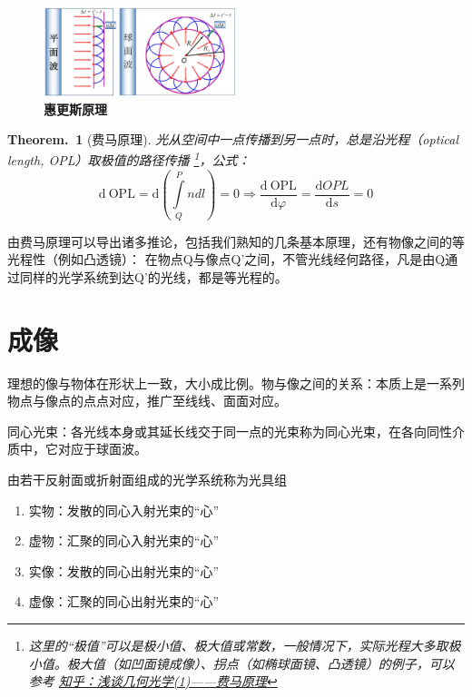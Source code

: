 \documentclass[UTF8]{report}
\theoremstyle{MyLineTheoremStyle} %
\theoremstyle{MyBlockTheoremStyle} %
\newtheorem{BlockTheorem}[LineTheorem]{Theorem.\,} %
\theoremstyle{MySubsubsectionStyle} %
\begin{document}
\begin{figure}[H]\centering
\includegraphics[width=0.5\textwidth]{assets/1,2/image (46).jpg}
\caption{\textbf{惠更斯原理}}\label{惠更斯原理}
\end{figure}

\begin{BlockTheorem}[费马原理]\label{费马原理}
光从空间中一点传播到另一点时，总是沿光程（optical length, OPL）取极值的路径传播 \footnote{这里的“极值”可以是极小值、极大值或常数，一般情况下，实际光程大多取极小值。极大值（如凹面镜成像）、拐点（如椭球面镜、凸透镜）的例子，可以参考 \href{https://zhuanlan.zhihu.com/p/107739173}{知乎：浅谈几何光学(1)——费马原理}}，公式：
\begin{equation}
    \mathrm{d}\ \mathrm{OPL} =  \mathrm{d}\left(\int\limits_{Q}^{P}ndl\right)=0 \Longrightarrow \frac{\mathrm{d}\  \mathrm{OPL} }{\mathrm{d} \varphi } = \frac{\mathrm{d} OPL }{\mathrm{d} s } = 0 
\end{equation}
\end{BlockTheorem}
由费马原理可以导出诸多推论，包括我们熟知的几条基本原理，还有物像之间的等光程性（例如凸透镜）：
在物点Q与像点Q’之间，不管光线经何路径，凡是由Q通过同样的光学系统到达Q’的光线，都是等光程的。

\section{成像}

理想的像与物体在形状上一致，大小成比例。物与像之间的关系：本质上是一系列物点与像点的点点对应，推广至线线、面面对应。

同心光束：各光线本身或其延长线交于同一点的光束称为同心光束，在各向同性介质中，它对应于球面波。

由若干反射面或折射面组成的光学系统称为光具组

\begin{enumerate}
\item 实物：发散的同心入射光束的“心”
\item 虚物：汇聚的同心入射光束的“心”
\item 实像：发散的同心出射光束的“心”
\item 虚像：汇聚的同心出射光束的“心”
\end{enumerate}
\end{document}
